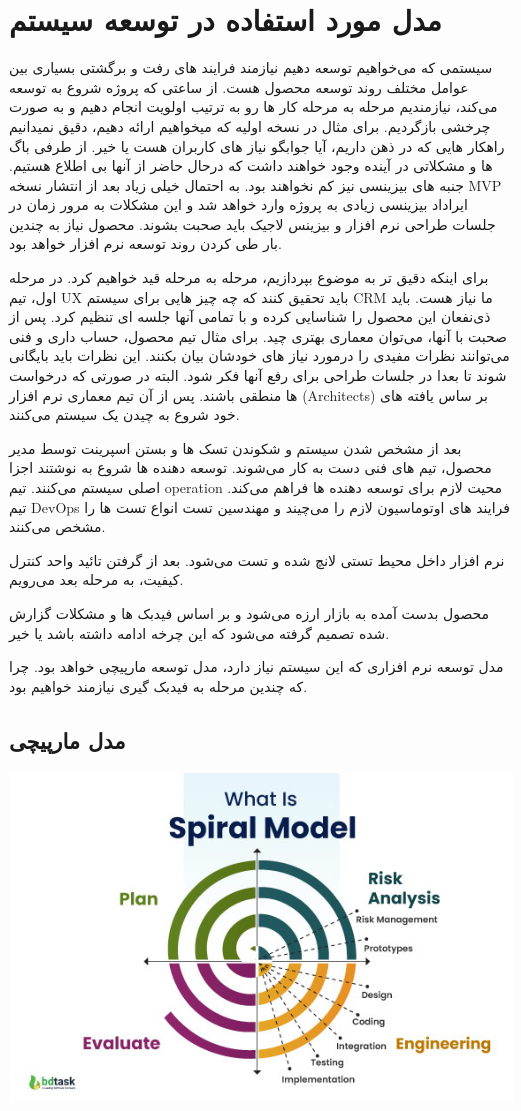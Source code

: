 \newpage
\section{مدل مورد استفاده در توسعه سیستم}
سیستمی که می‌خواهیم توسعه دهیم نیازمند فرایند های رفت و برگشتی بسیاری بین عوامل مختلف روند توسعه محصول هست. از ساعتی که پروژه شروع به توسعه می‌کند، 
نیازمندیم مرحله به مرحله کار ها رو به ترتیب اولویت انجام دهیم و به صورت چرخشی بازگردیم. برای مثال در نسخه اولیه که میخواهیم ارائه دهیم، دقیق نمیدانیم راهکار هایی که
در ذهن داریم، آیا جوابگو نیاز های کاربران هست یا خیر. از طرفی باگ ها و مشکلاتی در آینده وجود خواهند داشت که درحال حاضر از آنها بی اطلاع  هستیم.
جنبه های بیزینسی نیز کم نخواهند بود. به احتمال خیلی زیاد بعد از انتشار نسخه MVP ایراداد بیزینسی زیادی به پروژه وارد خواهد شد و این مشکلات به مرور زمان
در جلسات طراحی نرم افزار و بیزینس لاجیک باید صحبت بشوند. محصول نیاز به چندین بار طی کردن روند توسعه نرم افزار خواهد بود.

برای اینکه دقیق تر به موضوع بپردازیم، مرحله به مرحله قید خواهیم کرد. در مرحله اول، تیم UX باید تحقیق کنند که چه چیز هایی برای سیستم CRM ما نیاز هست.
باید ذی‌نفعان این محصول را شناسایی کرده و با تمامی آنها جلسه ای تنظیم کرد. پس از صحبت با آنها، می‌توان معماری بهتری چید.
برای مثال تیم محصول، حساب داری و فنی می‌توانند نظرات مفیدی را درمورد نیاز های خودشان بیان بکنند. این نظرات باید بایگانی شوند تا بعدا در جلسات طراحی برای 
رفع آنها فکر شود. البته در صورتی که درخواست ها منطقی باشند.
پس از آن تیم معماری نرم افزار (Architects) بر ساس یافته های خود شروع به چیدن یک سیستم می‌کنند.

بعد از مشخص شدن سیستم و شکوندن تسک ها و بستن اسپرینت توسط مدیر محصول، تیم های فنی دست به کار می‌شوند. توسعه دهنده ها شروع به نوشتند اجزا اصلی 
سیستم می‌کنند. تیم operation محیت لازم برای توسعه دهنده ها فراهم می‌کند.
تیم DevOps فرایند های اوتوماسیون لازم را می‌چیند و مهندسین تست انواع تست ها را مشخص می‌کنند.

نرم افزار داخل محیط تستی لانچ شده و تست می‌شود. بعد از گرفتن تائید واحد کنترل کیفیت، به مرحله بعد می‌رویم.

محصول بدست آمده به بازار ارزه می‌شود و بر اساس فیدبک ها و مشکلات گزارش شده تصمیم گرفته می‌شود که این چرخه ادامه داشته باشد یا خیر.

مدل توسعه نرم افزاری که این سیستم نیاز دارد، مدل توسعه مارپیچی خواهد بود. چرا که چندین مرحله به فیدبک گیری نیازمند خواهیم بود.

\subsection{مدل مارپیچی}
\includegraphics{assets/spiral_model.jpg}

